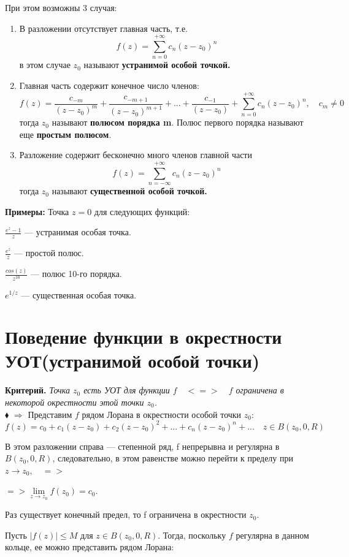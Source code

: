 \documentclass[a4paper, 12pt]{report}
\begin{document}
При этом возможны 3 случая:
\begin{enumerate}
    \item В разложении отсутствует главная часть, т.е. 
    $$f(z)=\sum\limits_{n=0}^{+\infty} c_n (z-z_0)^n$$
    в этом случае $z_0$ называют \textbf{устранимой особой точкой.}
    \item Главная часть содержит конечное число членов:
    $$f(z)=\frac{c_{-m}}{(z-z_0)^m}+\frac{c_{-m+1}}{(z-z_0)^{m+1}}+...+\frac{c_{-1}}{(z-z_0)}+\sum\limits_{n=0}^{+\infty} c_n (z-z_0)^n, \quad c_m\not= 0$$
    тогда $z_0$ называют \textbf{полюсом порядка m}. Полюс первого порядка называют еще \textbf{простым полюсом}.
    \item Разложение содержит бесконечно много членов главной части
$$f(z)=\sum\limits_{n=-\infty}^{+\infty} c_n (z-z_0)^n$$
тогда $z_0$ называют \textbf{существенной особой точкой.}
\end{enumerate}

\textbf{Примеры: } \quad Точка $z=0$ для следующих функций:
\par\bigskip
$\frac{e^z-1}{z}$ --- устранимая особая точка.
\bigskip

$\frac{e^z}{z}$ --- простой полюс.
\bigskip

$\frac{cos(z)}{z^{10}}$ --- полюс 10-го порядка.
\bigskip

$e^{1/z}$ --- существенная особая точка.


\section{Поведение функции в окрестности УОТ(устранимой особой точки)}

\textbf{Критерий.} \quad \textit{Точка $z_0$ есть УОТ для функции $f \quad<=>\quad f$  ограничена в некоторой окрестности этой точки $z_0$.}\\
$\blacklozenge$ \hspace{1 mm} $\Rightarrow$ \quad Представим $f$ рядом Лорана в окрестности особой точки $z_0$:
$$f(z)=c_0+c_1(z-z_0)+c_2(z-z_0)^2+...+c_n(z-z_0)^n+...\quad z\in B(z_0,0,R)$$

В этом разложении справа --- степенной ряд, f непрерывна и регулярна в $B(z_0,0,R)$, следовательно, в этом равенстве можно перейти к пределу при $z\to z_0,\quad =>$ 

$=>\lim\limits_{z \to z_0} f(z_0)=c_0$.\par\bigskip Раз существует конечный предел, то f ограничена в окрестности $z_0$.
\par\bigskip
\Leftarrow \quad Пусть $|f(z)|\leqslant M$ для $z\in B(z_0,0,R)$. Тогда, поскольку $f$ регулярна в данном кольце, ее можно представить рядом Лорана:
\end{document}
